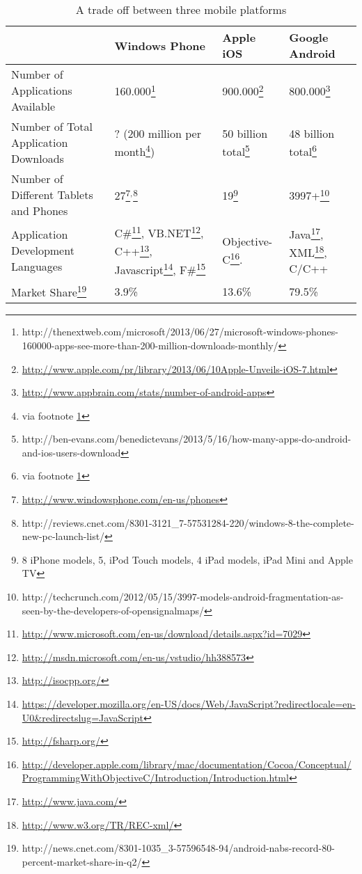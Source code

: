 \begin{savenotes}
\begin{table}[h]
\begin{center}
\caption{A trade off between three mobile platforms 
\label{tab:trade_off_mob}}
	\begin{tabularx}{\textwidth}{|X|X|X|X|}
	\hline
	& Windows Phone & Apple iOS & Google Android\\ \hline
	
	Number of Applications Available 
	& 160.000\footnote{http://thenextweb.com/microsoft/2013/06/27/microsoft-windows-phones-160000-apps-see-more-than-200-million-downloads-monthly/\label{downloads}} 
	& 900.000\footnote{\url{http://www.apple.com/pr/library/2013/06/10Apple-Unveils-iOS-7.html}} 	
	& 800.000\footnote{\url{http://www.appbrain.com/stats/number-of-android-apps}} \\ \hline
	
	Number of Total Application Downloads 
	& ? (200 million per month\footnote{via footnote \ref{downloads}}) 
	& 50 billion total\footnote{\label{note1}http://ben-evans.com/benedictevans/2013/5/16/how-many-apps-do-android-and-ios-users-download}
	& 48 billion total\footnote{via footnote \ref{note1}} \\ \hline 

	Number of Different Tablets and Phones 
	& 27\footnote{\url{http://www.windowsphone.com/en-us/phones}}$^{,}$\footnote{http://reviews.cnet.com/8301-3121\_7-57531284-220/windows-8-the-complete-new-pc-launch-list/}
	& 19\footnote{8 iPhone models, 5, iPod Touch models, 4 iPad models, iPad Mini and Apple TV}
	& 3997+\footnote{http://techcrunch.com/2012/05/15/3997-models-android-fragmentation-as-seen-by-the-developers-of-opensignalmaps/} \\ \hline
	
	Application Development Languages 
	& C\#\footnote{\url{http://www.microsoft.com/en-us/download/details.aspx?id=7029}}, VB.NET\footnote{\url{http://msdn.microsoft.com/en-us/vstudio/hh388573}}, C++\footnote{\url{http://isocpp.org/}}, Javascript\footnote{\url{https://developer.mozilla.org/en-US/docs/Web/JavaScript?redirectlocale=en-U0\&redirectslug=JavaScript}}, F\#\footnote{\url{http://fsharp.org/}} 
	& Objective-C\footnote{\url{http://developer.apple.com/library/mac/documentation/Cocoa/Conceptual/ProgrammingWithObjectiveC/Introduction/Introduction.html}}.
	& Java\footnote{\url{http://www.java.com/}}, XML\footnote{\url{http://www.w3.org/TR/REC-xml/}}, C/C++ \\ \hline
	
	Market Share\footnote{http://news.cnet.com/8301-1035\_3-57596548-94/android-nabs-record-80-percent-market-share-in-q2/}		& 3.9\% & 13.6\% & 79.5\% \\ \hline

	\end{tabularx}
\end{center}
\end{table}
\end{savenotes}